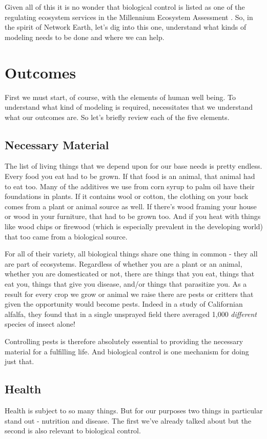 \documentclass[11pt,a5paper]{book}
\begin{document}
Given all of this it is no wonder that biological control is listed as one of the regulating ecosystem services in the Millennium Ecosystem Assessment \cite{mas}. So, in the spirit of Network Earth, let's dig into this one, understand what kinds of modeling needs to be done and where we can help.

\section{Outcomes}
First we must start, of course, with the elements of human well being. To understand what kind of modeling is required, necessitates that we understand what our outcomes are. So let's briefly review each of the five elements.

\subsection{Necessary Material}
The list of living things that we depend upon for our base needs is pretty endless. Every food you eat had to be grown. If that food is an animal, that animal had to eat too. Many of the additives we use from corn syrup to palm oil have their foundations in plants. If it contains wool or cotton, the clothing on your back comes from a plant or animal source as well. If there's wood framing your house or wood in your furniture, that had to be grown too. And if you heat with things like wood chips or firewood (which is especially prevalent in the developing world) that too came from a biological source.
\newline

For all of their variety, all biological things share one thing in common - they all are part of ecosystems. Regardless of whether you are a plant or an animal, whether you are domesticated or not, there are things that you eat, things that eat you, things that give you disease, and/or things that parasitize you. As a result for every crop we grow or animal we raise there are pests or critters that given the opportunity would become pests. Indeed in a study of Californian alfalfa, they found that in a single unsprayed field there averaged 1,000 \textit{different} species of insect alone! 
\newline

Controlling pests is therefore absolutely essential to providing the necessary material for a fulfilling life. And biological control is one mechanism for doing just that.

\subsection{Health}
Health is subject to so many things. But for our purposes two things in particular stand out - nutrition and disease. The first we've already talked about but the second is also relevant to biological control. 
\newline
\end{document}
